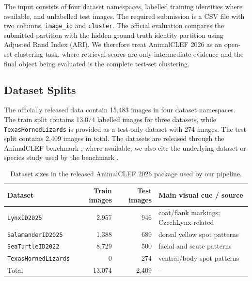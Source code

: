 \documentclass{ceurart}
\newcommand{\dataset}[1]{\texttt{#1}}
\newcommand{\method}[1]{\texttt{#1}}
\newcommand{\datasetname}[1]{\mbox{\texttt{\small #1}}}
\begin{document}
The input consists of four dataset namespaces, labelled training identities where available, and unlabelled test images. The required submission is a CSV file with two columns, \method{image\_id} and \method{cluster}. The official evaluation compares the submitted partition with the hidden ground-truth identity partition using Adjusted Rand Index (ARI). We therefore treat AnimalCLEF 2026 as an open-set clustering task, where retrieval scores are only intermediate evidence and the final object being evaluated is the complete test-set clustering.

\subsection{Dataset Splits}

The officially released data contain 15,483 images in four dataset namespaces. The train split contains 13,074 labelled images for three datasets, while \datasetname{TexasHornedLizards} is provided as a test-only dataset with 274 images. The test split contains 2,409 images in total. The datasets are released through the AnimalCLEF benchmark \cite{animalclef2026overview}; where available, we also cite the underlying dataset or species study used by the benchmark \cite{animalclef2025overview,seaturtleid2022,czechlynx,biffi2025identification}.

\begin{table}[t]
  \centering
  \caption{Dataset sizes in the released AnimalCLEF 2026 package used by our pipeline.}
  \label{tab:data}
  \begin{tabular}{lrrl}
    \toprule
    Dataset & Train images & Test images & Main visual cue / source \\
    \midrule
    \dataset{LynxID2025} & 2,957 & 946 & coat/flank markings; CzechLynx-related \cite{czechlynx} \\
    \dataset{SalamanderID2025} & 1,388 & 689 & dorsal yellow spot patterns \cite{animalclef2025overview} \\
    \dataset{SeaTurtleID2022} & 8,729 & 500 & facial and scute patterns \cite{seaturtleid2022} \\
    \dataset{TexasHornedLizards} & 0 & 274 & ventral/body spot patterns \cite{biffi2025identification} \\
    \midrule
    Total & 13,074 & 2,409 & -- \\
    \bottomrule
  \end{tabular}
\end{table}
\end{document}
